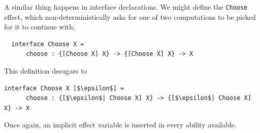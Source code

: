 \documentclass[msc,deptreport,cs]{infthesis} %
\newcommand{\code}[1]{\lstinline{#1}}
\newcommand{\todo}[1]
           {{\par\noindent\small\color{RoyalPurple}
  \framebox{\parbox{\dimexpr\linewidth-2\fboxsep-2\fboxrule}
    {\textbf{TODO:} #1}}}}
\begin{document}
A similar thing happens in interface declarations. We might define the
\code{Choose} effect, which non-deterministically asks for one of two
computations to be picked for it to continue with;

\begin{lstlisting}
  interface Choose X =
      choose : {[Choose X] X} -> {[Choose X] X} -> X
\end{lstlisting}

\noindent This definition desugars to

\begin{lstlisting}[mathescape]
  interface Choose X [$\epsilon$] =
      choose : {[$\epsilon$| Choose X] X} -> {[$\epsilon$| Choose X] X} -> X
\end{lstlisting}

\noindent Once again, an implicit effect variable is inserted in every ability
available.





\end{document}

